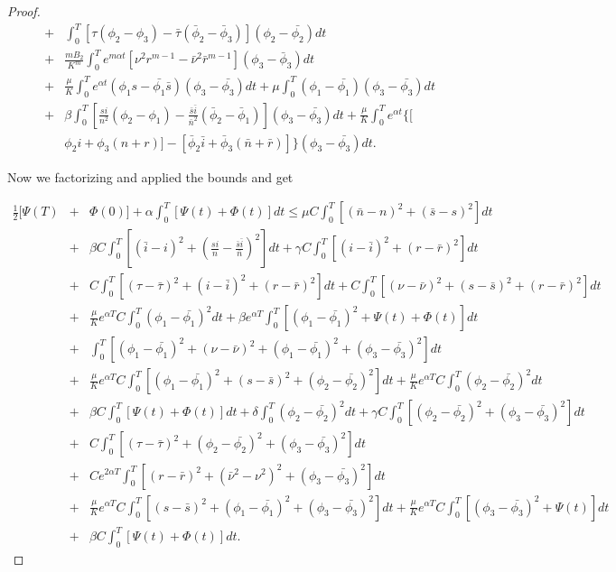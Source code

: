 \begin{proof}
\begin{eqnarray*}
	&+&\int_{0}^{T}[\tau(\phi_2-\phi_3)-\bar{\tau}(\bar{\phi}_2-\bar{\phi}_3)](\phi_2-\bar{\phi_2})dt\\&+&
	\frac{m B_2}{K^m}\int_{0}^{T}e^{m\alpha t}[\nu^2r^{m-1}-\bar{\nu}^2\bar{r}^{m-1}](\phi_3-\bar{\phi}_3)dt\\
	&+&\frac{\mu}{K}\int_{0}^{T}e^{\alpha t}(\phi_1 s-\bar{\phi_1}\bar{s})(\phi_3-\bar{\phi_3})dt +\mu\int_{0}^{T}(\phi_1-\bar{\phi_1})(\phi_3-\bar{\phi_3})dt\nonumber\\
	&+&\beta\int_{0}^{T}\left[\frac{s i}{n^2}(\phi_2-\phi_1)-\frac{\bar{s} \bar{i}}{\bar{n}^2}(\bar{\phi}_2-\bar{\phi}_1)\right](\phi_3-\bar{\phi_3})dt+\frac{\mu}{K}\int_{0}^{T}e^{\alpha t}\{[ \nonumber\\
	&&\phi_2 i+\phi_3(n+r)]-[\bar{\phi}_2 \bar{i}+\bar{\phi}_3(\bar{n}+\bar{r})]\}(\phi_3-\bar{\phi_3})dt. 
\end{eqnarray*}

Now we factorizing and applied the bounds and get

\begin{eqnarray*}
	\frac{1}{2}[\Psi(T)&+&\Phi(0)]+\alpha\int_{0}^{T}[\Psi(t)+\Phi(t)]dt\leq \mu C\int_{0}^{T}[(\bar{n}-n)^2+(\bar{s}-s)^2]dt\\
	&+&\beta C\int_{0}^{T}\left[(\bar{i}-i)^2+\left(\frac{si}{n}-\frac{\bar{s}\bar{i}}{\bar{n}}\right)^2\right]dt+\gamma C\int_{0}^{T}[(i-\bar{i})^2+(r-\bar{r})^2]dt\\
	&+&C\int_{0}^{T}[(\tau-\bar{\tau})^2+(i-\bar{i})^2+(r-\bar{r})^2]dt+C\int_{0}^{T}[(\nu-\bar{\nu})^2+(s-\bar{s})^2+(r-\bar{r})^2]dt\\
	&+&\frac{\mu}{K}e^{\alpha T}C\int_{0}^{T}(\phi_1-\bar{\phi_1})^2dt+\beta e^{\alpha T}\int_{0}^{T}[(\phi_1-\bar{\phi_1})^2+\Psi(t)+\Phi(t)]dt\\
	&+&\int_{0}^{T}[(\phi_1-\bar{\phi_1})^2+(\nu-\bar{\nu})^2+(\phi_1-\bar{\phi_1})^2+(\phi_3-\bar{\phi_3})^2]dt\\
	&+&\frac{\mu}{K}e^{\alpha T}C\int_{0}^{T}[(\phi_1-\bar{\phi_1})^2+(s-\bar{s})^2+(\phi_2-\bar{\phi_2})^2]dt+\frac{\mu}{K}e^{\alpha T}C\int_{0}^{T}(\phi_2-\bar{\phi_2})^2dt\\
	&+& \beta C\int_{0}^{T}[\Psi(t)+\Phi(t)]dt+\delta\int_{0}^{T}(\phi_2-\bar{\phi_2})^2dt+\gamma C\int_{0}^{T}[(\phi_2-\bar{\phi_2})^2+(\phi_3-\bar{\phi_3})^2]dt\\
	&+& C\int_{0}^{T}[(\tau-\bar{\tau})^2+(\phi_2-\bar{\phi_2})^2+(\phi_3-\bar{\phi_3})^2]dt\\
	&+&Ce^{2\alpha T}\int_{0}^{T}[(r-\bar{r})^2+(\bar{\nu}^2-\nu^2)^2+(\phi_3-\bar{\phi_3})^2]dt\\
	&+&\frac{\mu}{K}e^{\alpha T}C\int_{0}^{T}[(s-\bar{s})^2+(\phi_1-\bar{\phi_1})^2+(\phi_3-\bar{\phi_3})^2]dt + \frac{\mu}{K}e^{\alpha T}C\int_{0}^{T}[(\phi_3-\bar{\phi_3})^2+\Psi(t)]dt\\
	&+&\beta C\int_{0}^{T}[\Psi (t)+\Phi(t)]dt.
\end{eqnarray*}


\end{proof}

